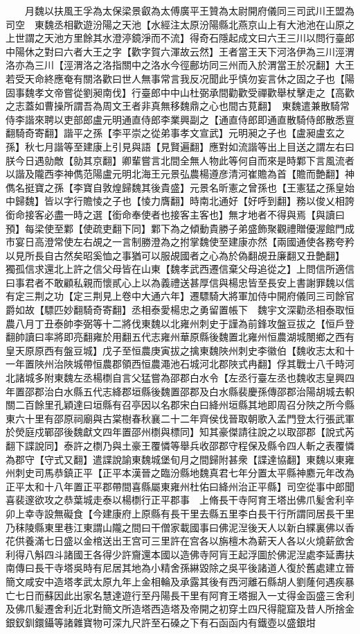 　　月魏以扶風王孚為太保梁景叡為太傅廣平王贊為太尉開府儀同三司武川王盟為司空　東魏丞相歡遊汾陽之天池【水經注太原汾陽縣北燕京山上有大池池在山原之上世謂之天池方里餘其水澄渟鏡淨而不流】得奇石隱起成文曰六王三川以問行臺郎中陽休之對曰六者大王之字【歡字賀六渾故云然】王者當王天下河洛伊為三川涇渭洛亦為三川【涇渭洛之洛指關中之洛水今徑鄜坊同三州而入於渭當王於况翻】大王若受天命終應奄有關洛歡曰世人無事常言我反况聞此乎慎勿妄言休之固之子也【陽固事魏孝文帝嘗從劉昶南伐】行臺郎中中山杜弼承間勸歡受禪歡舉杖擊走之【高歡之志蓋如曹操所謂吾為周文王者非真無移魏鼎之心也間古莧翻】　東魏遣兼散騎常侍李諧來聘以吏部郎盧元明通直侍郎李業興副之【通直侍郎即通直散騎侍郎散悉亶翻騎奇寄翻】諧平之孫【李平崇之從弟事孝文宣武】元明昶之子也【盧昶盧玄之孫】秋七月諧等至建康上引見與語【見賢遍翻】應對如流諧等出上目送之謂左右曰朕今日遇勍敵【勍其京翻】卿輩嘗言北間全無人物此等何自而來是時鄴下言風流者以諧及隴西李神儁范陽盧元明北海王元景弘農楊遵彦清河崔贍為首【贍而艶翻】神儁名挺寶之孫【李寶自敦煌歸魏其後貴盛】元景名昕憲之曾孫也【王憲猛之孫皇始中歸魏】皆以字行贍㥄之子也【㥄力膺翻】時南北通好【好呼到翻】務以俊乂相誇銜命接客必盡一時之選【銜命奉使者也接客主客也】無才地者不得與焉【與讀曰預】每梁使至鄴【使疏吏翻下同】鄴下為之傾動貴勝子弟盛飾聚觀禮贈優渥館門成市宴日高澄常使左右覘之一言制勝澄為之拊掌魏使至建康亦然【兩國通使各務夸矜以見所長自古然矣昭奚恤之事猶可以服覘國者之心為於偽翻覘丑廉翻又丑艶翻】　獨孤信求還北上許之信父母皆在山東【魏孝武西遷信棄父母追從之】上問信所適信曰事君者不敢顧私親而懷貳心上以為義禮送甚厚信與楊忠皆至長安上書謝罪魏以信有定三荆之功【定三荆見上卷中大通六年】遷驃騎大將軍加侍中開府儀同三司餘官爵如故【驃匹妙翻騎奇寄翻】丞相泰愛楊忠之勇留置帳下　魏宇文深勸丞相泰取恒農八月丁丑泰帥李弼等十二將伐東魏以北雍州刺史于謹為前鋒攻盤豆拔之【恒戶登翻帥讀曰率將即亮翻雍於用翻五代志雍州華原縣後魏置北雍州恒農湖城閿鄉之西有皇天原原西有盤豆城】戊子至恒農庚寅拔之擒東魏陜州刺史李徽伯【魏收志太和十一年置陜州治陜城帶恒農郡領西恒農澠池石城河北郡陜式冉翻】俘其戰士八千時河北諸城多附東魏左丞楊檦自言父猛嘗為邵郡白水令【左丞行臺左丞也魏收志皇興四年置邵郡治白水縣五代志絳郡垣縣後魏置邵郡及白水縣裴慶孫傳邵郡治陽胡城去軹關二百餘里孔穎達曰垣縣有召亭因以名郡宋白曰絳州垣縣其地即周召分陜之所今縣東六十里有邵原祠廟與古棠樹春秋襄二十二年齊侯伐晉取朝歌入孟門登太行張武軍於熒庭戍鄲邵後魏獻文四年置邵州檦與標同】知其豪傑請往說之以取邵郡【說式芮翻下諜說同】泰許之檦乃與土豪王覆憐等舉兵收邵郡守程保及縣令四人斬之表覆憐為郡守【守式又翻】遣諜說諭東魏城堡旬月之間歸附甚衆【諜達協翻】東魏以東雍州刺史司馬恭鎮正平【正平本漢晉之臨汾縣地魏真君七年分置太平縣神䴥元年改為正平太和十八年置正平郡帶間喜縣屬東雍州杜佑曰絳州治正平縣】司空從事中郎聞喜裴邃欲攻之恭葉城走泰以楊檦行正平郡事　上脩長干寺阿育王塔出佛爪髪舍利辛卯上幸寺設無礙食【今建康府上原縣有長干里去縣五里李白長干行所謂同居長干里乃秣陵縣東里巷江東謂山隴之間曰干僧家載國事曰佛泥湼後天人以新白緤裏佛以香花供養滿七日盛以金棺送出王宫可三里許在宫各以旃檀木為薪天人各以火燒薪歛舍利得八斛四斗諸國王各得少許齎還本國以造佛寺阿肓王起浮圖於佛泥湼處李延夀扶南傳曰長干寺塔吳時有尼居其地為小精舍孫綝毀除之吳平後諸道人復於舊處建立晉簡文咸安中造塔孝武太原九年上金相輪及承露其後有西河離石縣胡人劉蕯何遇疾暴亡七日而蘇因此出家名慧達遊行至丹陽長干里有阿育王塔掘入一丈得金函盛三舍利及佛爪髪遷舍利近北對簡文所造塔西造塔及帝開之初穿土四尺得龍窟及昔人所捨金銀釵釧鐶鑷等諸雜寶物可深九尺許至石磉之下有石函函内有鐵壺以盛銀坩